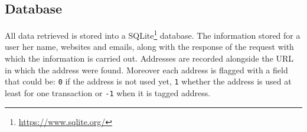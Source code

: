 \subsection{Database}
All data retrieved is stored into a
SQLite\footnote{\url{https://www.sqlite.org/}} database. The information stored
for a user her name, websites and emails, along with the response of the request
with which the information is carried out. Addresses are recorded alongside the
URL in which the address were found. Moreover each address is flagged with a
field that could be: \texttt{0} if the address is not used yet, \texttt{1}
whether the address is used at least for one transaction or \texttt{-1} when it
is tagged address.